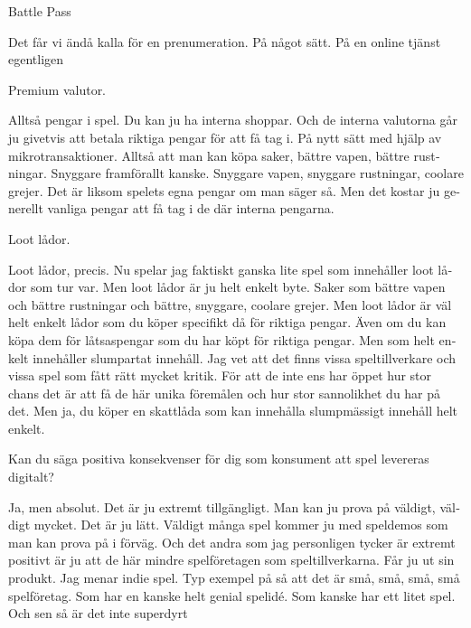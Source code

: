 \documentclass[11p]{article}
\begin{document}
\begin{otherlanguage}{swedish}
        \setlength{\leftskip}{0cm}
        Battle Pass


        \setlength{\leftskip}{1cm}
        Det får vi ändå kalla för en prenumeration. På något sätt.
        På en online tjänst egentligen



        \setlength{\leftskip}{0cm}
        Premium valutor.

        \setlength{\leftskip}{1cm}
        Alltså pengar i spel. Du kan ju ha interna shoppar. Och de interna valutorna går ju givetvis att betala riktiga pengar för att få tag i.
        På nytt sätt med hjälp av mikrotransaktioner. Alltså att man kan köpa saker, bättre vapen, bättre rustningar. Snyggare framförallt kanske. Snyggare vapen, snyggare rustningar, coolare grejer.
        Det är liksom spelets egna pengar om man säger så. Men det kostar ju generellt vanliga pengar att få tag i de där interna pengarna.



        \setlength{\leftskip}{0cm}
        Loot lådor.


        \setlength{\leftskip}{1cm}
        Loot lådor, precis. Nu spelar jag faktiskt ganska lite spel som innehåller loot lådor som tur var. Men loot lådor är ju helt enkelt byte.
        Saker som bättre vapen och bättre rustningar och bättre, snyggare, coolare grejer. Men loot lådor är väl helt enkelt lådor som du köper specifikt då för riktiga pengar.
        Även om du kan köpa dem för låtsaspengar som du har köpt för riktiga pengar. Men som helt enkelt innehåller slumpartat innehåll.  Jag vet att det finns vissa speltillverkare och vissa spel som fått rätt mycket kritik. För att de inte ens har öppet hur stor chans det är att få de här unika föremålen och hur stor sannolikhet du har på det. Men ja, du köper en skattlåda som kan innehålla slumpmässigt innehåll helt enkelt.



        \setlength{\leftskip}{0cm}
        Kan du säga positiva konsekvenser för dig som konsument att spel levereras digitalt?


        \setlength{\leftskip}{1cm}
        Ja, men absolut. Det är ju extremt tillgängligt.  Man kan ju prova på väldigt, väldigt mycket. Det är ju lätt. Väldigt många spel kommer ju med speldemos som man kan prova på i förväg.  Och det andra som jag personligen tycker är extremt positivt är  ju att de här mindre spelföretagen som speltillverkarna. Får ju ut sin produkt. Jag menar indie spel. Typ exempel på så att det är små, små, små, små spelföretag. Som har en kanske helt genial spelidé. Som kanske har ett litet spel. Och sen så är det inte superdyrt




\end{otherlanguage}
\end{document}
